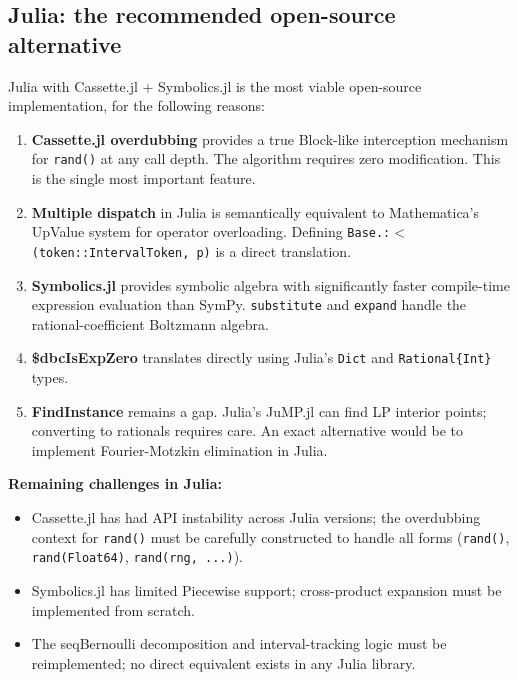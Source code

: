 \documentclass[12pt,a4paper]{article}
\theoremstyle{critical}
\theoremstyle{remark}
\theoremstyle{verified}
\begin{document}
\subsection{Julia: the recommended open-source alternative}

Julia with Cassette.jl + Symbolics.jl is the most viable open-source
implementation, for the following reasons:

\begin{enumerate}
\item \textbf{Cassette.jl overdubbing} provides a true Block-like interception
  mechanism for \texttt{rand()} at any call depth.  The algorithm requires zero
  modification.  This is the single most important feature.

\item \textbf{Multiple dispatch} in Julia is semantically equivalent to
  Mathematica's UpValue system for operator overloading.  Defining
  \texttt{Base.:$<$(token::IntervalToken, p)} is a direct translation.

\item \textbf{Symbolics.jl} provides symbolic algebra with significantly faster
  compile-time expression evaluation than SymPy.  \texttt{substitute} and
  \texttt{expand} handle the rational-coefficient Boltzmann algebra.

\item \textbf{\$dbcIsExpZero} translates directly using Julia's \texttt{Dict}
  and \texttt{Rational\{Int\}} types.

\item \textbf{FindInstance} remains a gap.  Julia's JuMP.jl can find LP interior
  points; converting to rationals requires care.  An exact alternative would be to
  implement Fourier-Motzkin elimination in Julia.
\end{enumerate}

\textbf{Remaining challenges in Julia:}
\begin{itemize}
\item Cassette.jl has had API instability across Julia versions; the overdubbing
  context for \texttt{rand()} must be carefully constructed to handle all forms
  (\texttt{rand()}, \texttt{rand(Float64)}, \texttt{rand(rng, ...)}).
\item Symbolics.jl has limited Piecewise support; cross-product expansion must be
  implemented from scratch.
\item The seqBernoulli decomposition and interval-tracking logic must be
  reimplemented; no direct equivalent exists in any Julia library.
\end{itemize}
\end{document}
